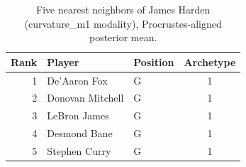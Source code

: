 \begin{table}[htbp]
  \centering\small
  \begin{tabular}{rllc}
    \toprule
    Rank & Player & Position & Archetype \\
    \midrule
    1 & De'Aaron Fox & G & 1 \\
    2 & Donovan Mitchell & G & 1 \\
    3 & LeBron James & G & 1 \\
    4 & Desmond Bane & G & 1 \\
    5 & Stephen Curry & G & 1 \\
    \bottomrule
  \end{tabular}
  \caption{Five nearest neighbors of James Harden (curvature_m1 modality), Procrustes-aligned posterior mean.}
  \label{tab:James_Harden_neighbors_curvature_m1}
\end{table}

